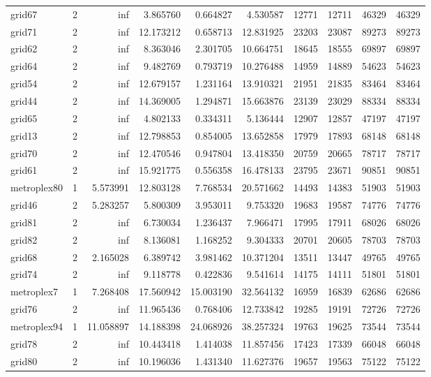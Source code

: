 \begin{longtable}{|l|r|r|r|r|r|r|r|r|r|}
grid67 & 2 & inf & 3.865760 & 0.664827 & 4.530587 & 12771 & 12711 & 46329 & 46329 \\
grid71 & 2 & inf & 12.173212 & 0.658713 & 12.831925 & 23203 & 23087 & 89273 & 89273 \\
grid62 & 2 & inf & 8.363046 & 2.301705 & 10.664751 & 18645 & 18555 & 69897 & 69897 \\
grid64 & 2 & inf & 9.482769 & 0.793719 & 10.276488 & 14959 & 14889 & 54623 & 54623 \\
grid54 & 2 & inf & 12.679157 & 1.231164 & 13.910321 & 21951 & 21835 & 83464 & 83464 \\
grid44 & 2 & inf & 14.369005 & 1.294871 & 15.663876 & 23139 & 23029 & 88334 & 88334 \\
grid65 & 2 & inf & 4.802133 & 0.334311 & 5.136444 & 12907 & 12857 & 47197 & 47197 \\
grid13 & 2 & inf & 12.798853 & 0.854005 & 13.652858 & 17979 & 17893 & 68148 & 68148 \\
grid70 & 2 & inf & 12.470546 & 0.947804 & 13.418350 & 20759 & 20665 & 78717 & 78717 \\
grid61 & 2 & inf & 15.921775 & 0.556358 & 16.478133 & 23795 & 23671 & 90851 & 90851 \\
metroplex80 & 1 & 5.573991 & 12.803128 & 7.768534 & 20.571662 & 14493 & 14383 & 51903 & 51903 \\
grid46 & 2 & 5.283257 & 5.800309 & 3.953011 & 9.753320 & 19683 & 19587 & 74776 & 74776 \\
grid81 & 2 & inf & 6.730034 & 1.236437 & 7.966471 & 17995 & 17911 & 68026 & 68026 \\
grid82 & 2 & inf & 8.136081 & 1.168252 & 9.304333 & 20701 & 20605 & 78703 & 78703 \\
grid68 & 2 & 2.165028 & 6.389742 & 3.981462 & 10.371204 & 13511 & 13447 & 49765 & 49765 \\
grid74 & 2 & inf & 9.118778 & 0.422836 & 9.541614 & 14175 & 14111 & 51801 & 51801 \\
metroplex7 & 1 & 7.268408 & 17.560942 & 15.003190 & 32.564132 & 16959 & 16839 & 62686 & 62686 \\
grid76 & 2 & inf & 11.965436 & 0.768406 & 12.733842 & 19285 & 19191 & 72726 & 72726 \\
metroplex94 & 1 & 11.058897 & 14.188398 & 24.068926 & 38.257324 & 19763 & 19625 & 73544 & 73544 \\
grid78 & 2 & inf & 10.443418 & 1.414038 & 11.857456 & 17423 & 17339 & 66048 & 66048 \\
grid80 & 2 & inf & 10.196036 & 1.431340 & 11.627376 & 19657 & 19563 & 75122 & 75122 \\

\end{longtable}
